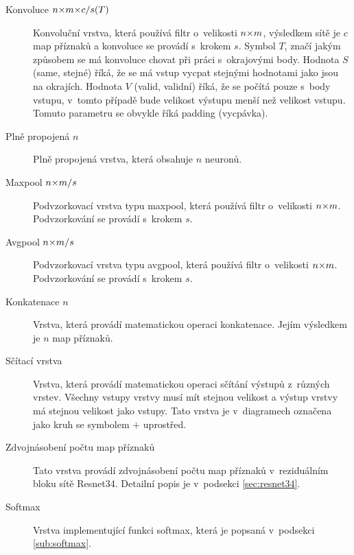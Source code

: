 \begin{description}
\item[Konvoluce $\sisetup{tight-spacing=true}n{\times}m{\times}c/s (T)$]
Konvoluční vrstva, která používá filtr o~velikosti $\sisetup{tight-spacing=true}n{\times}m$, výsledkem sítě je $c$ map příznaků a konvoluce se provádí s~krokem $s$.
Symbol $T$, značí jakým způsobem se má konvoluce chovat při práci s~okrajovými body.
Hodnota $S$ (same, stejné) říká, že se má vstup vycpat stejnými hodnotami jako jsou na okrajích.
Hodnota $V$ (valid, validní) říká, že se počítá pouze s~body vstupu, v~tomto případě bude velikost výstupu menší než velikost vstupu.
Tomuto parametru se obvykle říká padding (vycpávka).
\item[Plně propojená $n$]
Plně propojená vrstva, která obsahuje $n$ neuronů.
\item[Maxpool $\sisetup{tight-spacing=true}n{\times}m/s$]
Podvzorkovací vrstva typu maxpool, která používá filtr o~velikosti $\sisetup{tight-spacing=true}n{\times}m$.
Podvzorkování se provádí s~krokem $s$.
\item[Avgpool $\sisetup{tight-spacing=true}n{\times}m/s$]
Podvzorkovací vrstva typu avgpool, která používá filtr o~velikosti $\sisetup{tight-spacing=true}n{\times}m$.
Podvzorkování se provádí s~krokem $s$.
\item[Konkatenace $n$]
Vrstva, která provádí matematickou operaci konkatenace.
Jejím výsledkem je $n$ map příznaků.
\item[Sčítací vrstva]
Vrstva, která provádí matematickou operaci sčítání výstupů z~různých vrstev.
Všechny vstupy vrstvy musí mít stejnou velikost a výstup vrstvy má stejnou velikost jako vstupy.
Tato vrstva je v~diagramech označena jako kruh se symbolem $+$ uprostřed.
\item[Zdvojnásobení počtu map příznaků]
Tato vrstva provádí zdvojnásobení počtu map příznaků v~reziduálním bloku sítě Resnet34.
Detailní popis je v~podsekci \ref{sec:resnet34}.
\item[Softmax]
Vrstva implementující funkci softmax, která je popsaná v~podsekci \ref{sub:softmax}.
\end{description}

